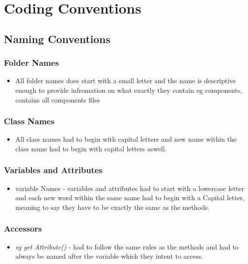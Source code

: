\documentclass[12pt]{article}
\begin{document}
     \section{Coding Conventions}
     \subsection{Naming Conventions}
     
     \subsubsection{Folder Names}
     \begin{itemize}
      	\item All folder names does start with a small letter and the name is descriptive enough to provide infromation on what exactly they contain eg components, contains all components files
      	\end{itemize}
     \subsubsection{Class Names}
      	\begin{itemize}
      	\item All class names had to begin with capital letters and new name within the class name had to begin with capital letters aswell.
      	\end{itemize}
      	
    	  \subsubsection{Variables and Attributes} 
      \begin{itemize}
     	\item variable Names - variables and attributes had to start with a lowercase letter and each new word within the same name had to begin with a Capital letter, meaning to say they have to be exactly the same 	as the methods.
     	\end{itemize}
     	\subsubsection{Accessors}
   \begin{itemize} 
 	 \item {\it eg get Attribute()} - had to follow the same rules as the methods and had to always be named after the variable which they intent to access.
 	 \end{itemize} 
 	 
\end{document}
